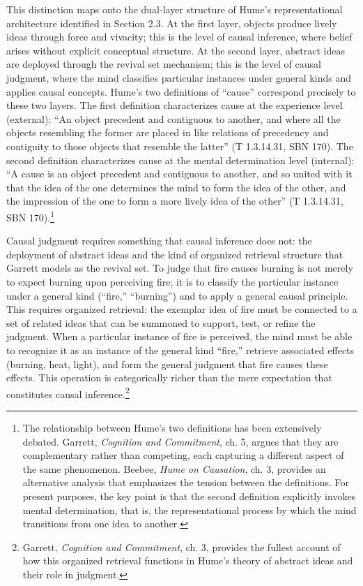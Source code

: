 \documentclass[11pt]{article}
\begin{document}
This distinction maps onto the dual-layer structure of Hume's representational architecture identified in Section 2.3. At the first layer, objects produce lively ideas through force and vivacity; this is the level of causal inference, where belief arises without explicit conceptual structure. At the second layer, abstract ideas are deployed through the revival set mechanism; this is the level of causal judgment, where the mind classifies particular instances under general kinds and applies causal concepts. Hume's two definitions of ``cause'' correspond precisely to these two layers. The first definition characterizes cause at the experience level (external): ``An object precedent and contiguous to another, and where all the objects resembling the former are placed in like relations of precedency and contiguity to those objects that resemble the latter'' (T 1.3.14.31, SBN 170). The second definition characterizes cause at the mental determination level (internal): ``A cause is an object precedent and contiguous to another, and so united with it that the idea of the one determines the mind to form the idea of the other, and the impression of the one to form a more lively idea of the other'' (T 1.3.14.31, SBN 170).\footnote{The relationship between Hume's two definitions has been extensively debated. Garrett, \emph{Cognition and Commitment}, ch. 5, argues that they are complementary rather than competing, each capturing a different aspect of the same phenomenon. Beebee, \emph{Hume on Causation}, ch. 3, provides an alternative analysis that emphasizes the tension between the definitions. For present purposes, the key point is that the second definition explicitly invokes mental determination, that is, the representational process by which the mind transitions from one idea to another.}

Causal judgment requires something that causal inference does not: the deployment of abstract ideas and the kind of organized retrieval structure that Garrett models as the revival set. To judge that fire causes burning is not merely to expect burning upon perceiving fire; it is to classify the particular instance under a general kind (``fire,'' ``burning'') and to apply a general causal principle. This requires organized retrieval: the exemplar idea of fire must be connected to a set of related ideas that can be summoned to support, test, or refine the judgment. When a particular instance of fire is perceived, the mind must be able to recognize it as an instance of the general kind ``fire,'' retrieve associated effects (burning, heat, light), and form the general judgment that fire causes these effects. This operation is categorically richer than the mere expectation that constitutes causal inference.\footnote{Garrett, \emph{Cognition and Commitment}, ch. 3, provides the fullest account of how this organized retrieval functions in Hume's theory of abstract ideas and their role in judgment.}
\end{document}
